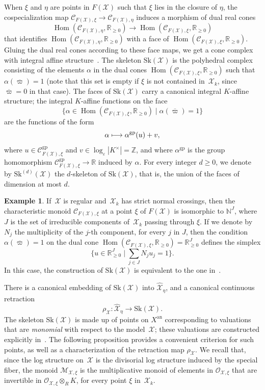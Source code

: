 \documentclass[JEP,XML,SOM,Unicode,NoFloatCountersInSection]{cedram}
\let\mathcal\mathscr
\newcommand{\mto}{\mathchoice{\longmapsto}{\mapsto}{\mapsto}{\mapsto}}
\theoremstyle{definition}
\newtheorem{example}[equation]{Example}
\numberwithin{equation}{subsection}
\newcommand{\N}{\ensuremath{\mathbb{N}}}
\newcommand{\Z}{\ensuremath{\mathbb{Z}}}
\newcommand{\R}{\ensuremath{\mathbb{R}}}
\newcommand{\cX}{\ensuremath{\mathscr{X}}}
\newcommand{\an}{\mathrm{an}}
\newcommand{\gp}{\mathrm{gp}}
\newcommand{\Sk}{\mathrm{Sk}}
\DeclareMathOperator{\Hom}{Hom}
\let\unif\varpi
\begin{document}
When $\xi$ and $\eta$ are points in $F(\cX)$ such that $\xi$ lies in the closure of $\eta$, the cospecialization map $\mathcal{C}_{F(\cX),\xi}\to \mathcal{C}_{F(\cX),\eta}$
induces a morphism of dual real cones
\[
\Hom(\mathcal{C}_{F(\cX),\eta},\R_{\geq 0})\to \Hom(\mathcal{C}_{F(\cX),\xi},\R_{\geq 0})
\]
that identifies $\Hom(\mathcal{C}_{F(\cX),\eta},\R_{\geq 0})$ with a face of $\Hom(\mathcal{C}_{F(\cX),\xi},\R_{\geq 0})$. Gluing the dual real cones according to these face maps, we
get a cone complex with integral affine structure~\cite{KKMS}.
The skeleton $\Sk(\cX)$ is the polyhedral complex
consisting of the elements $\alpha$ in the dual cones $\Hom(\mathcal{C}_{F(\cX),\xi},\R_{\geq 0})$ such that
$\alpha(\overline{\unif})=1$ (note that this set is empty if $\xi$ is not contained in~$\cX_k$, since $\overline{\unif}=0$ in that case). The faces of $\Sk(\cX)$ carry a canonical integral $K$\nobreakdash-affine structure; the integral $K$\nobreakdash-affine functions on the face
\[
\{\alpha\in \Hom(\mathcal{C}_{F(\cX),\xi},\R_{\geq 0})\mid \alpha(\overline{\unif})=1\}
\]
are the functions of the form
\[
\alpha\mto \alpha^{\gp}(u)+ v,
\]
where $u\in \mathcal{C}^{\gp}_{F(\cX),\xi}$ and $v\in \log_{\varepsilon}|K^{\times}|=\Z$, and where $\alpha^{\gp}$ is the group homomorphism $\mathcal{C}^{\gp}_{F(\cX),\xi}\to \R$ induced by $\alpha$.
For every integer $d\geq 0$, we denote by $\Sk^{(d)}(\cX)$ the $d$\nobreakdash-ske\-leton of $\Sk(\cX)$, that is, the union of the faces of dimension at most $d$.

\begin{example}\label{exam:snc}
If~$\cX$ is regular and~$\cX_k$ has strict normal crossings, then the characteristic monoid $\mathcal{C}_{F(\cX),\xi}$ at a point $\xi$ of $F(\cX)$ is isomorphic to $\N^J$, where $J$ is the set of irreducible components of~$\cX_k$ passing through $\xi$. If we denote by $N_j$ the multiplicity of the $j$-th component, for every $j$ in $J$, then the condition
$\alpha(\overline{\unif})=1$ on the dual cone $\Hom(\mathcal{C}_{F(\cX),\xi},\R_{\geq 0})=\R^J_{\geq 0}$ defines the simplex
\[
\{u\in \R^J_{\geq 0}\mid \textstyle\sum_{j\in J}N_ju_j=1\}.
\]
In this case, the construction of $\Sk(\cX)$ is equivalent to the one in~\cite[\S3]{MuNi}.
\end{example}

There is a canonical embedding of $\Sk(\cX)$ into $\widehat{\cX}_{\eta}$, and a canonical continuous retraction
\[
\rho_{\cX}\colon \widehat{\cX}_{\eta}\to \Sk(\cX).
\]
The skeleton $\Sk(\cX)$ is made up of points on $X^{\an}$ corresponding to valuations that are {\em monomial} with respect to the model~$\cX$; these valuations are constructed explicitly in~\cite[3.2.10]{BrMa}.
The following proposition provides a convenient criterion for such points, as well as a characterization of the retraction map $\rho_{\cX}$. We recall that, since the log structure on~$\cX$ is the divisorial log structure induced by the special fiber, the monoid $\mathcal{M}_{\cX,\xi}$ is the multiplicative monoid of elements in $\mathcal{O}_{\cX,\xi}$ that are invertible in $\mathcal{O}_{\cX,\xi}\otimes_R K$, for every point $\xi$ in~$\cX_k$.
\end{document}
